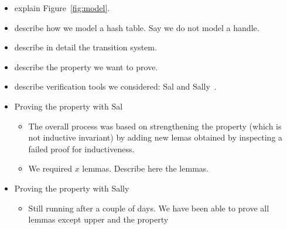 \begin{itemize}

\item explain Figure~\ref{fig:model}.

\item describe how we model a hash table. Say we do not model a
  handle.
  
\item describe in detail the transition system.

\item describe the property we want to prove.

\item describe verification tools we considered: Sal\cite{sal2} and
  Sally~\cite{sally}.
  
\item Proving the property with Sal
  \begin{itemize}

  \item The overall process was based on strengthening the property
    (which is not inductive invariant) by adding new lemas obtained by
    inspecting a failed proof for inductiveness.
    
  \item We required $x$ lemmas. Describe here the lemmas.
  \end{itemize}

\item Proving the property with Sally
  \begin{itemize}
  \item Still running after a couple of days. We have been able to
    prove all lemmas except \textsf{upper} and the property
  \end{itemize}
  
\end{itemize}




